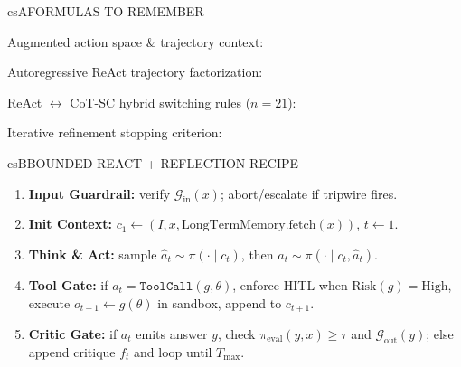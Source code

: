 \documentclass[../../../../master.tex]{subfiles}
\begin{document}
\begin{cscolumns}
\begin{cscard}{csA}{FORMULAS TO REMEMBER}
  \begin{csbul}
    \item Augmented action space \& trajectory context:
    \item Autoregressive ReAct trajectory factorization:
    \item ReAct $\leftrightarrow$ CoT-SC hybrid switching rules ($n=21$):
    \item Iterative refinement stopping criterion:
  \end{csbul}
\end{cscard}

\begin{cscard}{csB}{BOUNDED REACT + REFLECTION RECIPE}
  \begin{enumerate}[leftmargin=1.2em, itemsep=0.5pt, topsep=1pt, parsep=0pt]
    \item \textbf{Input Guardrail:} verify $\mathcal{G}_{\mathrm{in}}(x)$; abort/escalate if tripwire fires.
    \item \textbf{Init Context:} $c_1\leftarrow(I,x,\text{LongTermMemory.fetch}(x))$, $t\leftarrow 1$.
    \item \textbf{Think \& Act:} sample $\hat{a}_t\sim\pi(\cdot\mid c_t)$, then $a_t\sim\pi(\cdot\mid c_t,\hat{a}_t)$.
    \item \textbf{Tool Gate:} if $a_t=\texttt{ToolCall}(g,\theta)$, enforce HITL when $\mathrm{Risk}(g)=\mathrm{High}$, execute $o_{t+1}\leftarrow g(\theta)$ in sandbox, append to $c_{t+1}$.
    \item \textbf{Critic Gate:} if $a_t$ emits answer $y$, check $\pi_{\mathrm{eval}}(y,x)\ge\tau$ and $\mathcal{G}_{\mathrm{out}}(y)$; else append critique $f_t$ and loop until $T_{\max}$.
  \end{enumerate}
\end{cscard}
\columnbreak


\end{cscolumns}
\end{document}
